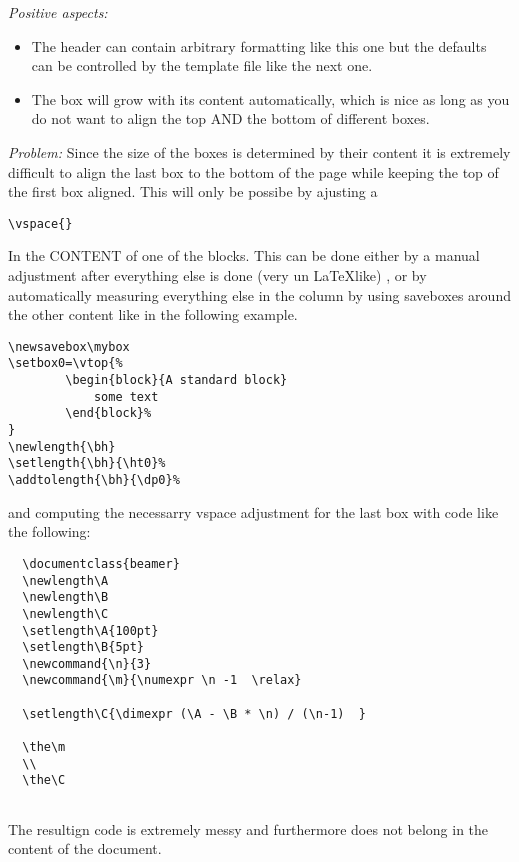 

\alert{\textit{Positive aspects:}}
\begin{itemize}
    \item The header can contain arbitrary formatting like this one
      but the defaults can be controlled by the template file like the next one.
    \item The box will grow with its content automatically, which is nice
      as long as you do not want to align the top AND the bottom of different boxes.
\end{itemize}
 
\alert{\textit{Problem:}}
Since the size of the boxes is determined by their content it is extremely difficult to align the last box to the bottom of the page
while keeping the top of the first box aligned.
This will only be possibe by ajusting a 
\begin{verbatim}
\vspace{}
\end{verbatim}
In the CONTENT of one of the blocks.
This can be done either by    a manual adjustment after everything else is done (very un \LaTeX like) , or by automatically measuring everything else in the column by using saveboxes around the other content like in the following example.
\begin{verbatim}
\newsavebox\mybox
\setbox0=\vtop{%
		\begin{block}{A standard block} 
			some text  
		\end{block}%
}
\newlength{\bh}
\setlength{\bh}{\ht0}%
\addtolength{\bh}{\dp0}%
\end{verbatim}
and computing the necessarry vspace adjustment for the last box with code like the following:
{\small
  \begin{verbatim}
  \documentclass{beamer}
  \newlength\A
  \newlength\B
  \newlength\C
  \setlength\A{100pt}
  \setlength\B{5pt}
  \newcommand{\n}{3}
  \newcommand{\m}{\numexpr \n -1  \relax}
  
  \setlength\C{\dimexpr (\A - \B * \n) / (\n-1)  }
  
  \the\m
  \\
  \the\C
  
  \end{verbatim}
}
The resultign code is extremely messy and furthermore does not belong in the content of the document.
\vspace{1cm}


